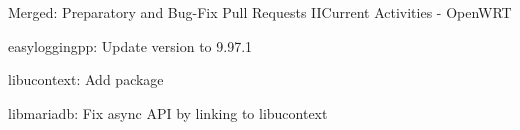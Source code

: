 ﻿\begin{frame}{\alert{Merged:} Preparatory and Bug-Fix Pull Requests II}{Current Activities - OpenWRT}
   \begin{description}
    \item [openwrt/packages] easyloggingpp: Update version to 9.97.1\\\href{https://github.com/openwrt/packages/pull/21637}{}
    \item [openwrt/packages] libucontext: Add package\\\href{https://github.com/openwrt/packages/pull/21933}{}
    \item [openwrt/packages] libmariadb: Fix async API by linking to libucontext\\\href{https://github.com/openwrt/packages/pull/22011}{}
  \end{description}
\end{frame}
